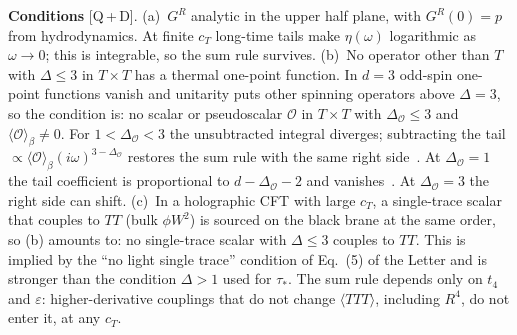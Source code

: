 \textbf{Conditions} [Q\,+\,D].
(a)~$G^R$ analytic in the upper half plane, with $G^R(0)=p$ from hydrodynamics. At finite $c_T$ long-time tails make
$\eta(\omega)$ logarithmic as $\omega\to0$; this is integrable, so the sum rule survives.
(b)~No operator other than $T$ with $\Delta\le3$ in $T\times T$ has a thermal one-point function. In $d=3$ odd-spin one-point
functions vanish and unitarity puts other spinning operators above $\Delta=3$, so the condition is: no scalar or pseudoscalar
$\mathcal O$ in $T\times T$ with $\Delta_{\mathcal O}\le3$ and $\langle\mathcal O\rangle_\beta\ne0$. For $1<\Delta_{\mathcal O}<3$
the unsubtracted integral diverges; subtracting the tail $\propto\langle\mathcal O\rangle_\beta(i\omega)^{3-\Delta_{\mathcal O}}$
restores the sum rule with the same right side~\cite{Chowdhury:2016hjy,Lucas:2017dqa}. At $\Delta_{\mathcal O}=1$ the tail
coefficient is proportional to $d-\Delta_{\mathcal O}-2$ and vanishes~\cite{Lucas:2017dqa}. At $\Delta_{\mathcal O}=3$ the right
side can shift.
(c)~In a holographic CFT with large $c_T$, a single-trace scalar that couples to $TT$ (bulk $\phi W^2$) is sourced on the black
brane at the same order, so (b) amounts to: no single-trace scalar with $\Delta\le3$ couples to $TT$. This is implied by the
``no light single trace'' condition of Eq.~(5) of the Letter and is stronger than the condition $\Delta>1$ used for $\tau_*$.
The sum rule depends only on $t_4$ and $\varepsilon$: higher-derivative couplings that do not change $\langle TTT\rangle$,
including $R^4$, do not enter it, at any $c_T$.

